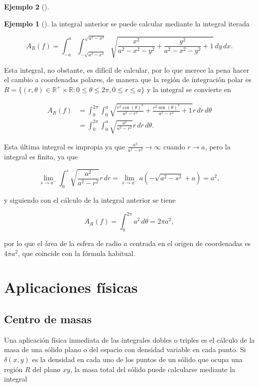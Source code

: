 \documentclass[
  a4paper,
]{scrreport}
\theoremstyle{definition}
\newtheorem{example}{Ejemplo}[chapter]
\theoremstyle{plain}
\theoremstyle{definition}
\theoremstyle{definition}
\theoremstyle{plain}
\theoremstyle{plain}
\theoremstyle{remark}
\begin{document}
\begin{example}[]
\begin{example}[]
la integral anterior se puede calcular mediante la integral iterada

\[
A_R(f) = \int_{-a}^a \int_{-\sqrt{a^2-x^2}}^{\sqrt{a^2-x^2}} \sqrt{\frac{x^2}{a^2-x^2-y^2} + \frac{y^2}{a^2-x^2-y^2} + 1}\,dy\,dx.
\]

Esta integral, no obstante, es difícil de calcular, por lo que merece la
pena hacer el cambio a coordenadas polares, de manera que la región de
integración polar es
\(R=\{(r,\theta)\in \mathbb{R}^+\times \mathbb{R}: 0\leq \theta\leq 2\pi, 0\leq r\leq a\}\)
y la integral se convierte en

\begin{align*}
A_R(f) 
&= \int_0^{2\pi} \int_0^a \sqrt{\frac{r^2\cos(\theta)^2}{a^2-r^2}+\frac{r^2\operatorname{sen}(\theta)^2}{a^2-r^2}+1}r\,dr\,d\theta \\
&= \int_0^{2\pi} \int_0^a \sqrt{\frac{a^2}{a^2-r^2}}r\,dr\,d\theta.
\end{align*}

Esta última integral es impropia ya que
\(\frac{a^2}{a^2-r^2}\to \infty\) cuando \(r\to a\), pero la integral es
finita, ya que

\[
\lim_{s\to a^-}\int_0^s \sqrt{\frac{a^2}{a^2-r^2}} r\,dr
= \lim_{s\to a^-} a(-\sqrt{a^2-s^2}+a) = a^2,
\]

y siguiendo con el cálculo de la integral anterior se tiene

\[
A_R(f)
= \int_0^{2\pi} a^2\,d\theta
= 2\pi a^2,
\]

por lo que el área de la esfera de radio \(a\) centrada en el origen de
coordenadas es \(4\pi a^2\), que coincide con la fórmula habitual.

\end{example}

\section{Aplicaciones físicas}\label{aplicaciones-fuxedsicas-1}

\subsection{Centro de masas}\label{centro-de-masas-1}

Una aplicación física inmediata de las integrales dobles o triples es el
cálculo de la masa de una sólido plano o del espacio con densidad
variable en cada punto. Si \(\delta(x,y)\) es la densidad en cada uno de
los puntos de un sólido que ocupa una región \(R\) del plano \(xy\), la
masa total del sólido puede calcularse mediante la integral


\end{example}
\end{document}
